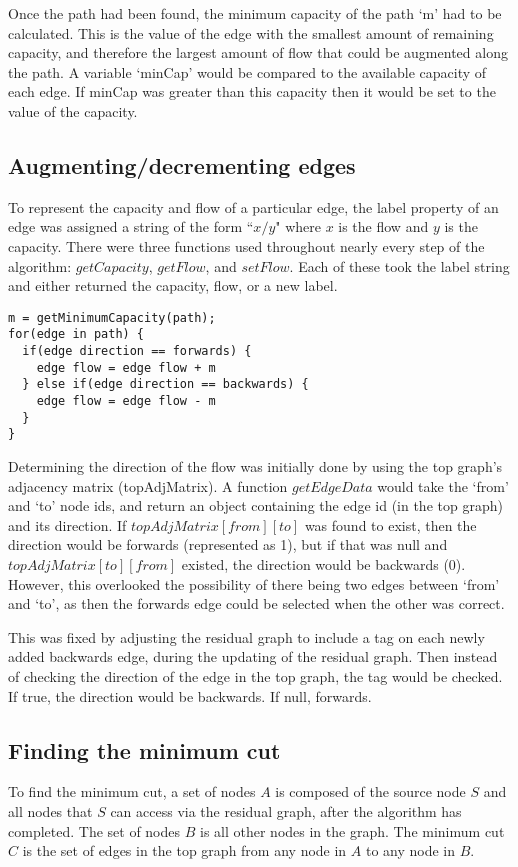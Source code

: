 \documentclass{l4proj}
\begin{document}
Once the path had been found, the minimum capacity of the path `m' had to be calculated. This is the value of the edge with the smallest amount of remaining capacity, and therefore the largest amount of flow that could be augmented along the path. A variable `minCap' would be compared to the available capacity of each edge. If minCap was greater than this capacity then it would be set to the value of the capacity.
\subsection{Augmenting/decrementing edges}
To represent the capacity and flow of a particular edge, the label property of an edge was assigned a string of the form ``$x/y$" where $x$ is the flow and $y$ is the capacity. There were three functions used throughout nearly every step of the algorithm: $getCapacity$, $getFlow$, and $setFlow$. Each of these took the label string and either returned the capacity, flow, or a new label.

\begin{lstlisting}
m = getMinimumCapacity(path);
for(edge in path) {
  if(edge direction == forwards) {
    edge flow = edge flow + m
  } else if(edge direction == backwards) {
    edge flow = edge flow - m
  }
}
\end{lstlisting}

Determining the direction of the flow was initially done by using the top graph's adjacency matrix (topAdjMatrix). A function $getEdgeData$ would take the `from' and `to' node ids, and return an object containing the edge id (in the top graph) and its direction. If $topAdjMatrix[from][to]$ was found to exist, then the direction would be forwards (represented as 1), but if that was null and $topAdjMatrix[to][from]$ existed, the direction would be backwards (0). However, this overlooked the possibility of there being two edges between `from' and `to', as then the forwards edge could be selected when the other was correct.

This was fixed by adjusting the residual graph to include a tag on each newly added backwards edge, during the updating of the residual graph. Then instead of checking the direction of the edge in the top graph, the tag would be checked. If true, the direction would be backwards. If null, forwards.

\subsection{Finding the minimum cut}
To find the minimum cut, a set of nodes $A$ is composed of the source node $S$ and all nodes that $S$ can access via the residual graph, after the algorithm has completed. The set of nodes $B$ is all other nodes in the graph. The minimum cut $C$ is the set of edges in the top graph from any node in $A$ to any node in $B$.
\end{document}

